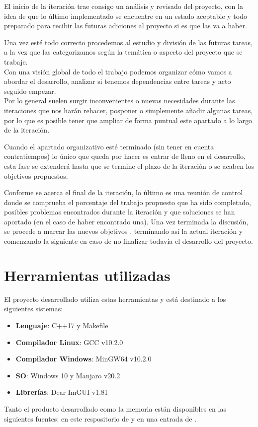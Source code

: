 El inicio de la iteración trae consigo un análisis y revisado del proyecto, con la idea de que lo último
implementado se encuentre en un estado aceptable y todo preparado para recibir las futuras adiciones
al proyecto si es que las va a haber.

Una vez esté todo correcto procedemos al estudio y división de las futuras tareas, a la vez 
que las categorizamos según la temática o aspecto del proyecto que se trabaje. \\
Con una visión global de todo el trabajo podemos organizar cómo vamos a
abordar el desarrollo, analizar si tenemos dependencias entre tareas y acto seguido empezar. \\
Por lo general suelen surgir inconvenientes o nuevas necesidades durante las iteraciones que
nos harán rehacer, posponer o simplemente añadir algunas tareas, por lo que es posible
tener que ampliar de forma puntual este apartado a lo largo de la iteración.

Cuando el apartado organizativo esté terminado (sin tener en cuenta contratiempos) lo único 
que queda por hacer es entrar de lleno en el desarrollo, esta fase se extenderá hasta que
se termine el plazo de la iteración o se acaben los objetivos propuestos. 

Conforme se acerca el final de la iteración, lo último es una reunión de control donde 
se comprueba el porcentaje del trabajo propuesto que ha sido completado, posibles problemas 
encontrados durante la iteración y que soluciones se han aportado (en el caso de haber 
encontrado una). Una vez terminada la discusión, se procede a marcar las nuevos objetivos
, terminando así la actual iteración y comenzando la siguiente en caso de no finalizar 
todavía el desarrollo del proyecto.


\section{Herramientas utilizadas}
El proyecto desarrollado utiliza estas herramientas y está destinado a los siguientes
sistemas:
\begin{itemize}
	\item \textbf{Lenguaje}: C++17 y Makefile
	\item \textbf{Compilador Linux}: GCC v10.2.0
	\item \textbf{Compilador Windows}: MinGW64 v10.2.0
	\item \textbf{SO}: Windows 10 y Manjaro v20.2
	\item \textbf{Librerías}: Dear ImGUI v1.81
\end{itemize}

Tanto el producto desarrollado como la memoria están disponibles en las siguientes fuentes: 
en este respositorio de \citeauthor*{BPW_GitHub_2021} y en una entrada de \citeauthor*{BPW_Archive_2021}.





